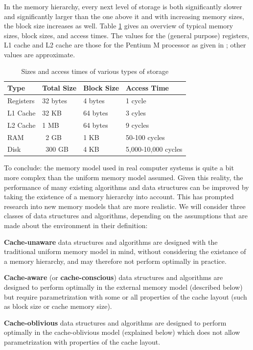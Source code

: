\documentclass{acm_proc_article-sp}
\begin{document}
In the memory hierarchy, every next level of storage is both significantly slower and significantly larger than the one above it and with increasing memory sizes, the block size increases as well. Table \ref{tab-memhier} gives an overview of typical memory sizes, block sizes, and access times. The values for the (general purpose) registers, L1 cache and L2 cache are those for the Pentium M processor as given in \cite{intel-opt}; other values are approximate.

\begin{table}
\begin{center}
\begin{tabular}{ l l l l }
\hline
\textbf{Type} & \textbf{Total Size} & \textbf{Block Size} & \textbf{Access Time} \\
\hline
Registers  &   32 bytes & 4 bytes & 1 cycle \\
L1 Cache   &   32 KB    & 64 bytes & 3 cyles \\
L2 Cache   &    1 MB    & 64 bytes & 9 cycles \\
RAM        &   ~2 GB    & 1 KB     & 50-100 cycles \\
Disk       & ~300 GB    & 4 KB     & 5,000-10,000 cycles \\
\hline
\end{tabular}
\caption{Sizes and access times of various types of storage}
\label{tab-memhier}
\end{center}
\end{table}

To conclude: the memory model used in real computer systems is quite a bit more complex than the uniform memory model assumed. Given this reality, the performance of many existing algorithms and data structures can be improved by taking the existence of a memory hierarchy into account. This has prompted research into new memory models that are more realistic. We will consider three classes of data structures and algorithms, depending on the assumptions that are made about the environment in their definition:
\begin{list}{}{}
\item \textbf{Cache-unaware} data structures and algorithms are designed with the traditional uniform memory model in mind, without considering the existance of a memory hierarchy, and may therefore not perform optimally in practice.
\item \textbf{Cache-aware} (or \textbf{cache-conscious}) data structures and algorithms are designed to perform optimally in the external memory model (described below) but require parametrization with some or all properties of the cache layout (such as block size or cache memory size).
\item \textbf{Cache-oblivious} data structures and algorithms are designed to perform optimally in the cache-oblivious model (explained below) which does not allow para\-metri\-zation with properties of the cache layout.
\end{list}
\end{document}
